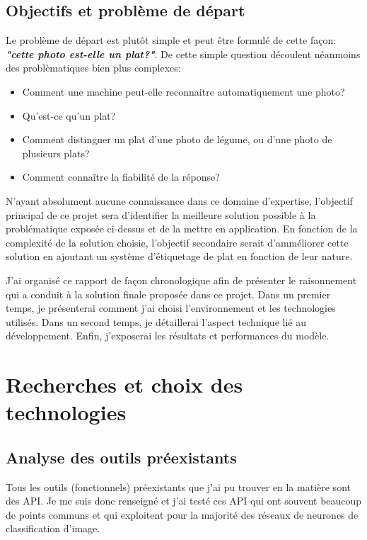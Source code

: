 \documentclass[a4paper,12pt]{report}
\begin{document}
    \section{Objectifs et problème de départ}
    Le problème de départ est plutôt simple et peut être formulé de cette façon: \textbf{\emph{"cette photo est-elle un plat?"}}. De cette simple question découlent néanmoins des problèmatiques bien plus complexes:
    \bigbreak
    \begin{itemize}
        \item Comment une machine peut-elle reconnaitre automatiquement une photo?
        \item Qu'est-ce qu'un plat?
        \item Comment distinguer un plat d'une photo de légume, ou d'une photo de plusieurs plats?
        \item Comment connaître la fiabilité de la réponse?
    \end{itemize}
    \bigbreak
    N'ayant absolument aucune connaissance dans ce domaine d'expertise, l'objectif principal de ce projet sera d'identifier la meilleure solution possible à la problématique exposée ci-dessus et de la mettre en application.
    \medbreak
    En fonction de la complexité de la solution choisie, l'objectif secondaire serait d'amméliorer cette solution en ajoutant un système d'étiquetage de plat en fonction de leur nature.

    \bigbreak
    J'ai organisé ce rapport de façon chronologique afin de présenter le raisonnement qui a conduit à la solution finale proposée dans ce projet. Dans un premier temps, je présenterai comment j'ai choisi l'environnement et les technologies utilisés. Dans un second temps, je détaillerai l'aspect technique lié au développement. Enfin, j'exposerai les résultats et performances du modèle.

  \chapter{Recherches et choix des technologies}

    \section{Analyse des outils préexistants}
    Tous les outils (fonctionnels) préexistants que j'ai pu trouver en la matière sont des API. Je me suis donc renseigné et j'ai testé ces API qui ont souvent beaucoup de points communs et qui exploitent pour la majorité des réseaux de neurones de classification d'image.
\end{document}
